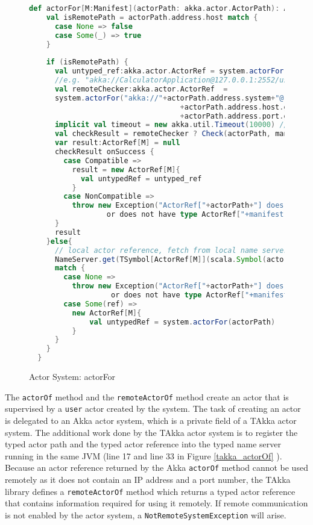 \begin{figure}[p]

\begin{lstlisting}[language=scala]
def actorFor[M:Manifest](actorPath: akka.actor.ActorPath): ActorRef[M]= {
    val isRemotePath = actorPath.address.host match {
      case None => false
      case Some(_) => true
    }
    
    if (isRemotePath) {
      val untyped_ref:akka.actor.ActorRef = system.actorFor(actorPath)      
      //e.g. "akka://CalculatorApplication@127.0.0.1:2552/user/ActorTypeServer"
      val remoteChecker:akka.actor.ActorRef  = 
      system.actorFor("akka://"+actorPath.address.system+"@"
                                   +actorPath.address.host.get+":"
                                   +actorPath.address.port.get+"/user/ActorTypeServer")
      implicit val timeout = new akka.util.Timeout(10000) // 10 seconds
      val checkResult = remoteChecker ? Check(actorPath, manifest[M]) 
      var result:ActorRef[M] = null
      checkResult onSuccess {
        case Compatible => 
          result = new ActorRef[M]{
            val untypedRef = untyped_ref
          } 
        case NonCompatible => 
          throw new Exception("ActorRef["+actorPath+"] does not exist 
                  or does not have type ActorRef["+manifest[M]+"]")
      }
      result
    }else{
      // local actor reference, fetch from local name server
      NameServer.get(TSymbol[ActorRef[M]](scala.Symbol(actorPath.toString))) 
      match {
        case None => 
          throw new Exception("ActorRef["+actorPath+"] does not exist 
                   or does not have type ActorRef["+manifest[M]+"]")
        case Some(ref) => 
          new ActorRef[M]{
        	  val untypedRef = system.actorFor(actorPath)
          }
      }
    }
  }
\end{lstlisting}
    \caption{Actor System:  actorFor}
    \label{takka_actorFor}
\end{figure}


The {\tt actorOf} method and the {\tt remoteActorOf} method create an actor 
that is supervised by a {\tt user} actor created by the system.  The task of 
creating an actor is delegated to an Akka actor system, which is a private field 
of a TAkka actor system.  The additional work done by the TAkka actor system is 
to register the typed actor path and the typed actor reference into the typed 
name server running in the same JVM (line 17 and line 33 in Figure 
\ref{takka_actorOf} ).  Because an actor reference returned by the Akka  
{\tt actorOf} method cannot be used remotely as it does not contain an IP 
address and a port number, the TAkka library defines a {\tt remoteActorOf} 
method which returns a typed actor reference that contains information 
required for using it remotely.  If remote communication is not enabled by the 
actor system, a {\tt NotRemoteSystemException} will arise.


